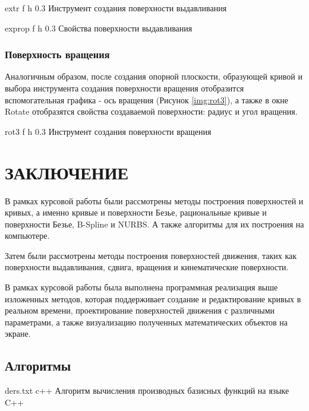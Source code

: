 \documentclass{bmstu}
\begin{document}
{extr} %
{f} %
{h} %
{0.3\textwidth} %
{Инструмент создания поверхности выдавливания} %

{exprop} %
{f} %
{h} %
{0.3\textwidth} %
{Свойства поверхности выдавливания} %

\subsection{Поверхность вращения}

Аналогичным образом, после создания опорной плоскости, образующей кривой и выбора инструмента создания поверхности вращения отобразится вспомогательная графика - ось вращения (Рисунок \ref{img:rot3}), а также в окне Rotate отобразятся свойства создаваемой поверхности: радиус и угол вращения.

{rot3} %
{f} %
{h} %
{0.3\textwidth} %
{Инструмент создания поверхности вращения} %


\chapter*{ЗАКЛЮЧЕНИЕ}

В рамках курсовой работы были рассмотрены методы построения поверхностей и кривых, а именно  кривые и поверхности Безье, рациональные кривые и поверхности Безье, B-Spline и NURBS. А также алгоритмы для их построения на компьютере.

Затем были рассмотрены методы построения поверхностей движения, таких как поверхности выдавливания, сдвига, вращения и кинематические поверхности.

В рамках курсовой работы была выполнена программная реализация выше изложенных методов, которая поддерживает создание и редактирование кривых в реальном времени, проектирование поверхностей движения с различными параметрами, а также визуализацию полученных математических объектов на экране.

\begin{appendices}
	\chapter{Алгоритмы}
{ders.txt} %
{c++} %
{Алгоритм вычисления производных базисных функций на языке C++} %

\end{appendices}
\end{document}
